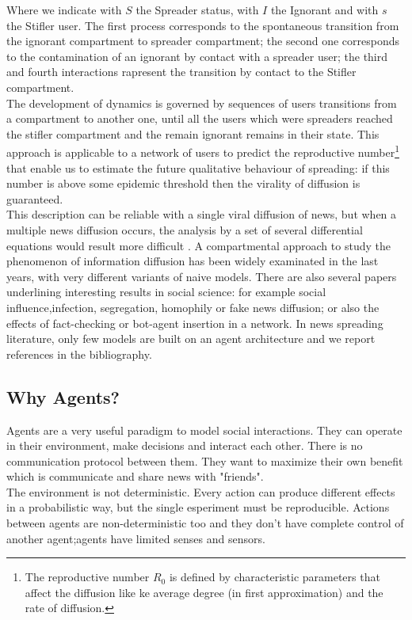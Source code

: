 \documentclass[11pt]{article} %
\begin{document}
Where we indicate with $S$ the Spreader status, with $I$ the Ignorant and with $s$ the Stifler user. 
The first process corresponds to the spontaneous transition from the ignorant compartment to spreader compartment;
 the second one corresponds to the contamination of an ignorant by contact with a spreader user; 
the third and fourth interactions rapresent the transition by contact to the Stifler compartment.  \\
The development of dynamics is governed by sequences of users transitions from a compartment to another one, until all the users which were spreaders reached the stifler compartment and the remain ignorant remains in their state.
This approach is applicable to a network of users to predict the reproductive 
number\footnote{The reproductive number $R_{0}$ is defined by characteristic parameters that affect the diffusion like ke average degree (in first approximation) and the rate of diffusion. } 
that enable us to estimate the future qualitative behaviour of spreading: 
if this number is above some epidemic threshold then the virality of diffusion is guaranteed.\\
This description can be reliable with a single viral diffusion of news, but when a
multiple news diffusion occurs, the analysis by a set of several differential equations would result more difficult .  
 A compartmental approach to study the phenomenon of information diffusion has been widely examinated in the last years, with very different variants of naive models.
There are also several papers underlining interesting results in social science: for example social influence,infection, segregation, homophily or fake news diffusion; or also the effects of fact-checking or bot-agent insertion in a network.
 In news spreading literature, only few models are built on an agent architecture and we report references in the bibliography.


\subsection{Why Agents?}
Agents are a very useful paradigm to model social interactions. 
They can operate in their environment, make decisions and interact each other.
There is no communication protocol between them. They want to maximize their own benefit which is
communicate and share news with "friends". \\
The environment is not deterministic. 
Every action can produce different effects in a probabilistic way, but the single esperiment must be reproducible.
Actions between agents are non-deterministic too and they don't have complete control of another
agent;agents have limited senses and sensors.
\\
\end{document}

